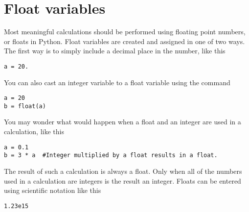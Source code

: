 \section{Float variables}
Most meaningful calculations should be performed using floating point
numbers, or floats in Python.  Float variables are created and assigned
in
one of two ways.  The first way is to simply include a decimal place
in the number, like this
\begin{Verbatim}
a = 20.
\end{Verbatim}
You can also cast an integer variable to a float variable using the
 command
\begin{Verbatim}
a = 20
b = float(a)
\end{Verbatim}
You may wonder what would happen when a float and an integer are used
in a calculation, like this
\begin{Verbatim}
a = 0.1
b = 3 * a  #Integer multiplied by a float results in a float.
\end{Verbatim}
The result of such a calculation is always a float.  Only when
all of the numbers used in a calculation are integers is the result an
integer.
Floats can be entered using scientific notation like this
\begin{Verbatim}
1.23e15
\end{Verbatim}

